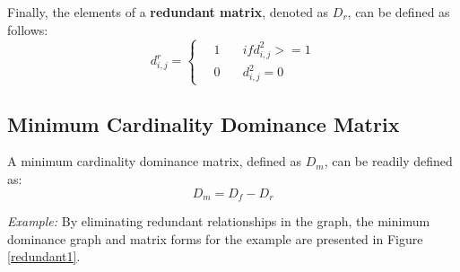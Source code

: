 \documentclass[12pt,english]{report}
\begin{document}
Finally, the elements of a \textbf{redundant matrix}, denoted as $ D_r$, can be defined as follows:
\begin{equation}
d^{r}_{i,j} =
  \begin{cases}
  \quad  1   & \quad if d^{2}_{i,j} >= 1 \\
  \quad  0  & \quad d^{2}_{i,j} = 0 
  \end{cases}   
\end{equation}

\subsection{Minimum Cardinality Dominance Matrix}
A minimum cardinality dominance matrix, defined as $D_m$, can be readily defined as: $$D_m = D_f - D_r $$

\vspace{0.15in}
\noindent \textit{Example:} By eliminating redundant relationships in the graph, the minimum dominance graph and matrix forms for the example are presented in Figure \ref{redundant1}.

\begin{figure}
    \begin{floatrow}
    \capbtabbox{%
    \begin{tabular}{l|llllll}
        & 1 & 2 & 3 & 4 & 5 & 6 \\ \hline
        1 & 0 & 0 & 0 & 0 & 0 & 0 \\
        2 & 1 & 0 & 0 & 1 & 1 & 0 \\
        3 & 0 & 1 & 0 & 0 & 0 & 0 \\
        4 & 0 & 0 & 0 & 0 & 0 & 0 \\
        5 & 0 & 0 & 0 & 0 & 0 & 0 \\
        6 & 0 & 1 & 0 & 0 & 0 & 0
    \end{tabular}
        \label{domin_matrix3}%
    }{%
    \caption{Minimum dominance in matrix form}%
    \label{redundant2}
}
\end{floatrow}
\end{figure}
\end{document}
